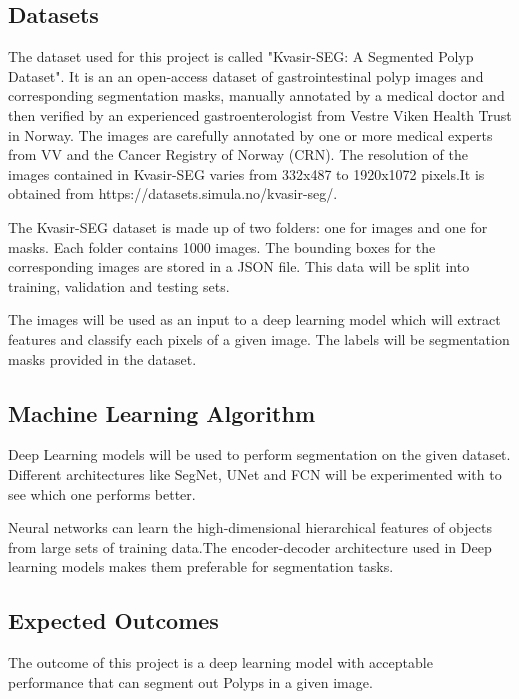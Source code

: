 \documentclass[11pt]{article}
\begin{document}
\subsection{Datasets}

The dataset used for this project is called "Kvasir-SEG: A Segmented Polyp Dataset". It is an an open-access dataset of gastrointestinal polyp images and corresponding segmentation masks, manually annotated by a medical doctor and then verified by an experienced gastroenterologist from Vestre Viken Health Trust in Norway. The images are carefully annotated by one or more medical experts from VV and the Cancer Registry of Norway (CRN). The resolution of the images contained in Kvasir-SEG varies from 332x487 to 1920x1072 pixels.It is obtained from https://datasets.simula.no/kvasir-seg/.

The Kvasir-SEG dataset is made up of two folders: one for images and one
for masks. Each folder contains 1000 images. The bounding boxes for the corresponding images are stored in a JSON file. This data will be split into training, validation and testing sets.   

The images will be used as an input to a deep learning model which will extract features and classify each pixels of a given image. The labels will be segmentation masks provided in the dataset.


\subsection{Machine Learning Algorithm}

Deep Learning models will be used to perform segmentation on the given dataset. Different architectures like SegNet, UNet and FCN will be experimented with to see which one performs better.

Neural networks can learn the high-dimensional hierarchical features of objects from large sets of training data.The encoder-decoder architecture used in Deep learning models makes them preferable for segmentation tasks. 



\subsection{Expected Outcomes}

The outcome of this project is a deep learning model with acceptable performance that can segment out Polyps in a given image.
\end{document}
